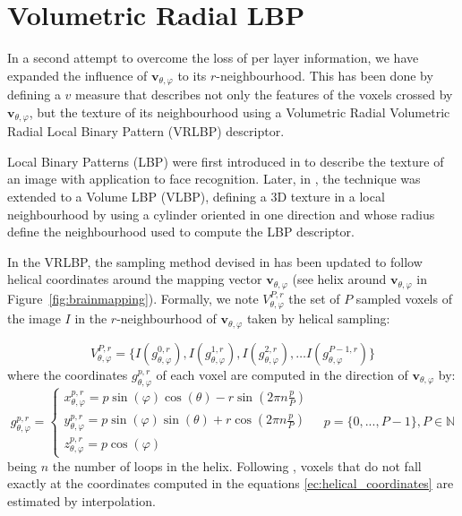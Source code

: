 \section{Volumetric Radial LBP}\label{sec:vrlbp}
In a second attempt to overcome the loss of per layer information, we have expanded the influence of $\mathbf{v}_{\theta,\varphi}$ to its $r$-neighbourhood. This has been done by defining a $v$ measure that describes not only the features of the voxels crossed by $\mathbf{v}_{\theta,\varphi}$, but the texture of its neighbourhood using a Volumetric Radial Volumetric Radial Local Binary Pattern (VRLBP) descriptor.

Local Binary Patterns (LBP) were first introduced in \cite{Ojala1996} to describe the texture of an image with application to face recognition. Later, in \cite{Zhao2007}, the technique was extended to a Volume LBP (VLBP), defining a 3D texture in a local neighbourhood by using a cylinder oriented in one direction and whose radius define the neighbourhood used to compute the LBP descriptor. 

In the VRLBP, the sampling method devised in \cite{Zhao2007} has been updated to follow helical coordinates around the mapping vector $\mathbf{v}_{\theta,\varphi}$ (see helix around $\mathbf{v}_{\theta,\varphi}$ in Figure~\ref{fig:brainmapping}). Formally, we note $V_{\theta,\varphi}^{P,r}$ the set of $P$ sampled voxels of the image $I$ in the $r$-neighbourhood of $\mathbf{v}_{\theta,\varphi}$ taken by helical sampling:

\begin{equation}
V_{\theta,\varphi}^{P,r}=\lbrace I(g_{\theta,\varphi}^{0,r}), I(g_{\theta,\varphi}^{1,r}), I(g_{\theta,\varphi}^{2,r}), \dots I(g_{\theta,\varphi}^{P-1,r})\rbrace
\end{equation} 
where the coordinates $g_{\theta,\varphi}^{p,r}$ of each voxel are computed in the direction of $\mathbf{v}_{\theta,\varphi}$ by: 
\begin{equation}
\label{ec:helical_coordinates}
g_{\theta,\varphi}^{p,r}=\begin{cases}
x_{\theta,\varphi}^{p,r}=p\sin(\varphi)\cos(\theta)-r\sin(2\pi n\frac{p}{P})\\
y_{\theta,\varphi}^{p,r}=p\sin(\varphi)\sin(\theta)+r\cos(2\pi n\frac{p}{P})\\
z_{\theta,\varphi}^{p,r}=p\cos(\varphi) 
\end{cases} \quad p=\{0,...,P-1\}, P \in \mathbb{N}
\end{equation}
being $n$ the number of loops in the helix. Following \cite{Zhao2007}, voxels that do not fall exactly at the coordinates computed in the equations \ref{ec:helical_coordinates} are estimated by interpolation.

